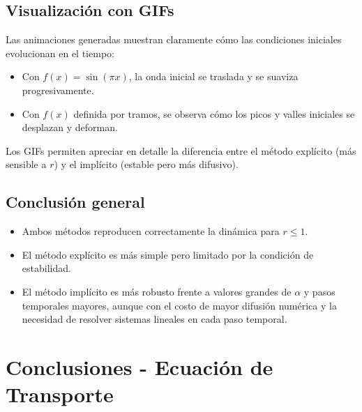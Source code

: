 \documentclass[12pt,a4paper]{article}
\begin{document}
\subsection*{Visualización con GIFs}
Las animaciones generadas muestran claramente cómo las condiciones iniciales evolucionan en el tiempo:
\begin{itemize}
    \item Con $f(x)=\sin(\pi x)$, la onda inicial se traslada y se suaviza progresivamente.
    \item Con $f(x)$ definida por tramos, se observa cómo los picos y valles iniciales se desplazan y deforman.
\end{itemize}
Los GIFs permiten apreciar en detalle la diferencia entre el método explícito (más sensible a $r$) y el implícito (estable pero más difusivo).

\subsection*{Conclusión general}
\begin{itemize}
    \item Ambos métodos reproducen correctamente la dinámica para $r \leq 1$.
    \item El método explícito es más simple pero limitado por la condición de estabilidad.
    \item El método implícito es más robusto frente a valores grandes de $\alpha$ y pasos temporales mayores, aunque con el costo de mayor difusión numérica y la necesidad de resolver sistemas lineales en cada paso temporal.
\end{itemize}

\section{Conclusiones - Ecuación de Transporte}
\end{document}
